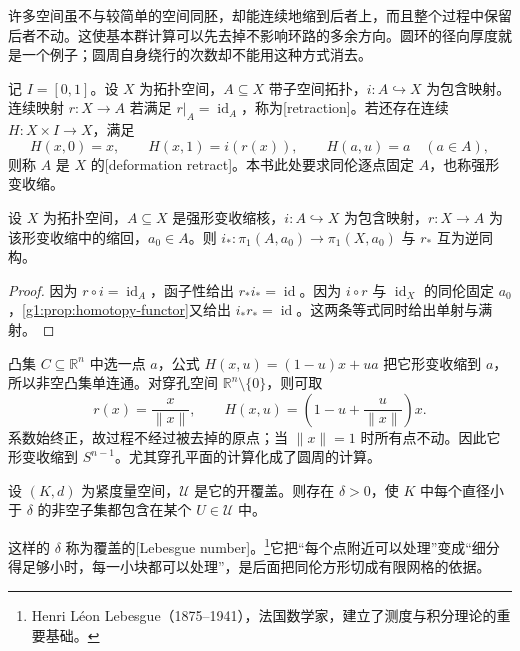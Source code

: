 许多空间虽不与较简单的空间同胚，却能连续地缩到后者上，而且整个过程中保留后者不动。这使基本群计算可以先去掉不影响环路的多余方向。圆环的径向厚度就是一个例子；圆周自身绕行的次数却不能用这种方式消去。

\begin{definition}\label{g1:def:deformation-retract}
	记 \(I=[0,1]\)。设 \(X\) 为拓扑空间，\(A\subseteq X\) 带子空间拓扑，\(i:A\hookrightarrow X\) 为包含映射。连续映射 \(r:X\rightarrow A\) 若满足 \(r|_A=\operatorname{id}_A\)，称为[retraction]。若还存在连续 \(H:X\times I\rightarrow X\)，满足
	\[
		H(x,0)=x,\qquad H(x,1)=i(r(x)),\qquad H(a,u)=a\quad(a\in A),
	\]
	则称 \(A\) 是 \(X\) 的[deformation retract]。本书此处要求同伦逐点固定 \(A\)，也称强形变收缩。
\end{definition}

\begin{proposition}\label{g1:prop:deformation-retract}
	设 \(X\) 为拓扑空间，\(A\subseteq X\) 是强形变收缩核，\(i:A\hookrightarrow X\) 为包含映射，\(r:X\to A\) 为该形变收缩中的缩回，\(a_0\in A\)。则 \(i_*:\pi_1(A,a_0)\rightarrow\pi_1(X,a_0)\) 与 \(r_*\) 互为逆同构。
\end{proposition}
\begin{proof}
	因为 \(r\circ i=\operatorname{id}_A\)，函子性给出 \(r_*i_*=\operatorname{id}\)。因为 \(i\circ r\) 与 \(\operatorname{id}_X\) 的同伦固定 \(a_0\)，\cref{g1:prop:homotopy-functor}又给出 \(i_*r_*=\operatorname{id}\)。这两条等式同时给出单射与满射。
\end{proof}

凸集 \(C\subseteq\mathbb R^n\) 中选一点 \(a\)，公式 \(H(x,u)=(1-u)x+ua\) 把它形变收缩到 \(a\)，所以非空凸集单连通。对穿孔空间 \(\mathbb R^n\setminus\{0\}\)，则可取
\[
	r(x)=\frac{x}{\lVert x\rVert},\qquad
	H(x,u)=\left(1-u+\frac{u}{\lVert x\rVert}\right)x.
\]
系数始终正，故过程不经过被去掉的原点；当 \(\lVert x\rVert=1\) 时所有点不动。因此它形变收缩到 \(S^{n-1}\)。尤其穿孔平面的计算化成了圆周的计算。

\begin{lemma}\label{g1:lem:lebesgue-number}
	设 \((K,d)\) 为紧度量空间，\(\mathcal U\) 是它的开覆盖。则存在 \(\delta>0\)，使 \(K\) 中每个直径小于 \(\delta\) 的非空子集都包含在某个 \(U\in\mathcal U\) 中。
\end{lemma}

这样的 \(\delta\) 称为覆盖的[Lebesgue number]。\footnote{Henri Léon Lebesgue（1875--1941），法国数学家，建立了测度与积分理论的重要基础。}它把“每个点附近可以处理”变成“细分得足够小时，每一小块都可以处理”，是后面把同伦方形切成有限网格的依据。

